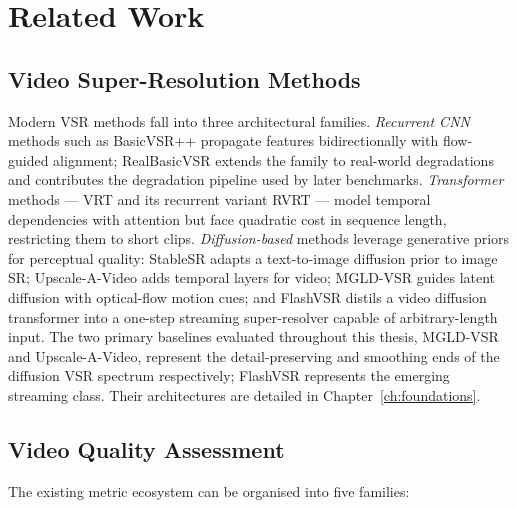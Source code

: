 \section{Related Work}
\label{sec:intro:related}

\subsection{Video Super-Resolution Methods}
\label{sec:related:vsr}

Modern VSR methods fall into three architectural families. \emph{Recurrent CNN} methods
such as BasicVSR++ \cite{chan_basicvsrpp_2022} propagate features bidirectionally with
flow-guided alignment; RealBasicVSR \cite{chan_realbasicvsr_2022} extends the family to
real-world degradations and contributes the degradation pipeline used by later
benchmarks. \emph{Transformer} methods --- VRT \cite{liang_vrt_2022} and its recurrent
variant RVRT \cite{liang_rvrt_2022} --- model temporal dependencies with attention but
face quadratic cost in sequence length, restricting them to short clips.
\emph{Diffusion-based} methods leverage generative priors for perceptual quality:
StableSR \cite{wang_stablesr_2024} adapts a text-to-image diffusion prior to image SR;
Upscale-A-Video \cite{zhou_upscale_2024} adds temporal layers for video; MGLD-VSR
\cite{he_mgld_2024} guides latent diffusion with optical-flow motion cues; and FlashVSR
\cite{zhuang_flashvsr_2025} distils a video diffusion transformer \cite{wan_wan_2025}
into a one-step streaming super-resolver capable of arbitrary-length input. The two
primary baselines evaluated throughout this thesis, MGLD-VSR and Upscale-A-Video,
represent the detail-preserving and smoothing ends of the diffusion VSR spectrum
respectively; FlashVSR represents the emerging streaming class. Their architectures are
detailed in Chapter~\ref{ch:foundations}.

\subsection{Video Quality Assessment}
\label{sec:related:vqa}

The existing metric ecosystem can be organised into five families:

